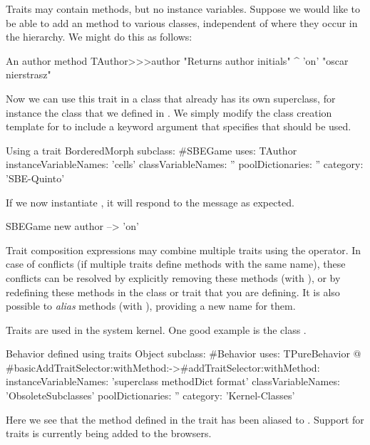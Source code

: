 \documentclass[a4paper,10pt,twoside]{book}
\begin{document}
Traits may contain methods, but no instance variables.
Suppose we would like to be able to add an  method to various classes, independent of where they occur in the hierarchy.
We might do this as follows:

\begin{method}[author]{An author method}
TAuthor>>>author
    "Returns author initials"
	^ 'on'    "oscar nierstrasz"
\end{method}

\noindent
Now we can use this trait in a class that already has its own superclass, for instance the  class that we defined in .
We simply modify the class creation template for  to include a  keyword argument that specifies that  should be used.

\begin{classdef}[sbegamewithtrait]{Using a trait}
BorderedMorph subclass: #SBEGame
	uses: TAuthor
	instanceVariableNames: 'cells'
	classVariableNames: ''
	poolDictionaries: ''
	category: 'SBE-Quinto'
\end{classdef}

If we now instantiate , it will respond to the  message as expected.

\begin{code}{}
SBEGame new author --> 'on'
\end{code}

Trait composition expressions may combine multiple traits using the \ct{+} operator.
In case of conflicts (\ie if multiple traits define methods with the same name), these conflicts can be resolved by explicitly removing these methods (with \ct{-}), or by redefining these methods in the class or trait that you are defining.
It is also possible to \emph{alias} methods (with ), providing a new name for them.

Traits are used in the system kernel.
One good example is the class .

\begin{classdef}[behaviorwithtraits]{Behavior defined using traits}
Object subclass: #Behavior
	uses: TPureBehavior @ {#basicAddTraitSelector:withMethod:->#addTraitSelector:withMethod:}
	instanceVariableNames: 'superclass methodDict format'
	classVariableNames: 'ObsoleteSubclasses'
	poolDictionaries: ''
	category: 'Kernel-Classes'
\end{classdef}
\noindent
Here we see that the method  defined in the trait  has been aliased to .
Support for traits is currently being added to the browsers.
\end{document}
